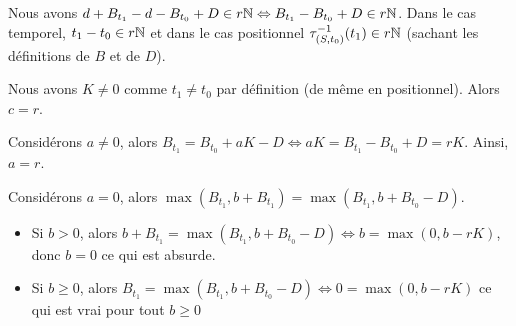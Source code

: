 Nous avons $d+B_{t_1}-d-B_{t_0}+D \in r\mathbb{N} \Leftrightarrow B_{t_1}-B_{t_0}+D\in r\mathbb{N}$. Dans le cas temporel, $t_1-t_0\in r\mathbb{N}$ et dans le cas positionnel $\tau_{(S,t_0)}^{-1}(t_1) \in r\mathbb{N}$ (sachant les définitions de $B$ et de $D$).

Nous avons $K \neq 0$ comme $t_1 \neq t_0$ par définition (de même en positionnel). Alors $c=r$. 

Considérons $a\neq 0$, alors $B_{t_1} = B_{t_0} + aK - D \Leftrightarrow aK = B_{t_1} - B_{t_0} + D = rK$. Ainsi, $a=r$.

Considérons $a = 0$, alors $\max(B_{t_1}, b+B_{t_1}) = \max(B_{t_1}, b+B_{t_0}-D)$. 
\begin{itemize}
\item Si $b>0$, alors $b+B_{t_1} = \max(B_{t_1}, b+ B_{t_0} - D) \Leftrightarrow b = \max(0, b - rK)$, donc $b =0$ ce qui est absurde.
\item Si $b \geq 0$, alors $B_{t_1} = \max(B_{t_1}, b+B_{t_0}-D) \Leftrightarrow 0 = \max(0, b - rK)$ ce qui est vrai pour tout $b\geq 0$
\end{itemize}
\findemo